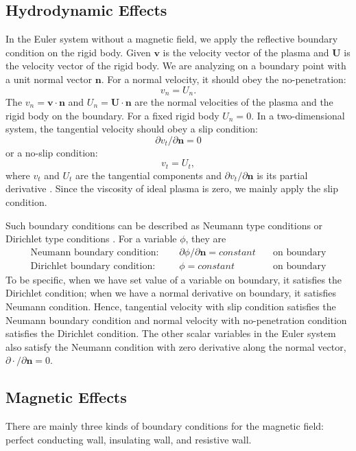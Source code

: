 \subsection{Hydrodynamic Effects}
\label{section2.3.1}
In the Euler system without a magnetic field, we apply the reflective boundary condition \cite{sambasivan2009ghost} on the rigid body. Given $\mathbf{v}$ is the velocity vector of the plasma and $\mathbf{U}$ is the velocity vector of the rigid body. We are analyzing on a boundary point with a unit normal vector $\mathbf{n}$. For a normal velocity, it should obey the no-penetration:
$$v_n=U_n.$$ The $v_n=\mathbf{v}\cdot\mathbf{n}$ and $U_n=\mathbf{U}\cdot\mathbf{n}$ are the normal velocities of the plasma and the rigid body on the boundary. For a fixed rigid body $U_n=0$. In a two-dimensional system, the tangential velocity should obey a slip condition:$$\partial v_t /\partial \mathbf{n} =0$$ or a no-slip condition: $$v_t =U_t,$$where $v_t$ and $U_t$ are the tangential components and $\partial v_t /\partial \mathbf{n}$ is its partial derivative . Since the viscosity of ideal plasma is zero, we mainly apply the slip condition. 

Such boundary conditions can be described as Neumann type conditions or Dirichlet type conditions \cite{arendt2004dirichlet}. For a variable $\phi$, they are 
\begin{align*}
    \text{Neumann boundary condition: } \quad &\partial \phi/\partial \mathbf{n} =constant \quad&\text{on boundary}\\
     \text{Dirichlet boundary condition: } \quad&\phi =constant \quad&\text{on boundary}
\end{align*}
To be specific, when we have set value of a variable on boundary, it satisfies the Dirichlet condition; when we have a normal derivative on boundary, it satisfies Neumann condition. Hence, tangential velocity with slip condition satisfies the Neumann boundary condition and normal velocity with no-penetration condition satisfies the Dirichlet condition. The other scalar variables in the Euler system also satisfy the Neumann condition with zero derivative along the normal vector, $\partial \cdot/\partial \mathbf{n}=0$.

\subsection{Magnetic Effects}
There are mainly three kinds of boundary conditions for the magnetic field: perfect conducting wall, insulating wall, and resistive wall.

